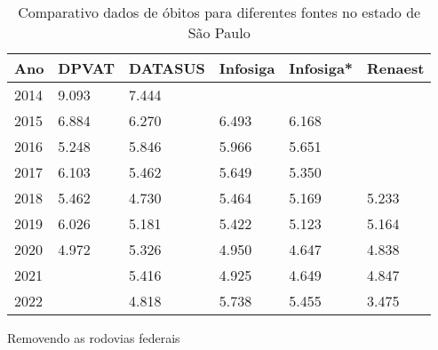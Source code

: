 \begin{table}[!ht]
    \centering
    \caption{Comparativo dados de óbitos para diferentes fontes no estado de São Paulo}
    \begin{tabular}{p{1.5cm}p{2cm}p{2cm}p{2cm}p{2cm}p{2cm}}
        Ano  & DPVAT & DATASUS & Infosiga & Infosiga* & Renaest \\ \hline
        2014 & 9.093 & 7.444 & ~ & ~ & ~ \\ \hline
        2015 & 6.884 & 6.270 & 6.493 & 6.168 & ~ \\ \hline
        2016 & 5.248 & 5.846 & 5.966 & 5.651 & ~ \\ \hline
        2017 & 6.103 & 5.462 & 5.649 & 5.350 & ~ \\ \hline
        2018 & 5.462 & 4.730 & 5.464 & 5.169 & 5.233 \\ \hline
        2019 & 6.026 & 5.181 & 5.422 & 5.123 & 5.164 \\ \hline
        2020 & 4.972 & 5.326 & 4.950 & 4.647 & 4.838 \\ \hline
        2021 & ~ & 5.416 & 4.925 & 4.649 & 4.847 \\ \hline
        2022 & ~ & 4.818 & 5.738 & 5.455 & 3.475 \\ \hline
    \end{tabular}
    \label{tab:comparativo}
    
    \vspace{2ex}
    
    {\raggedright * Removendo as rodovias federais}
    
\end{table}